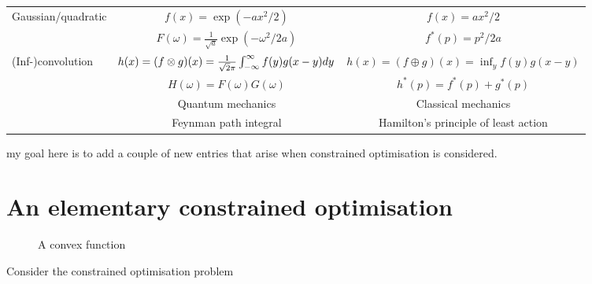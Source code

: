 \documentclass[10pt]{article}
\begin{document}
\begin{tabular}{| l | c | c |}
\hline

Gaussian/quadratic & $f(x) = \exp(-ax^2/2)$ & $f(x) = ax^2/2$ \\
& $F(\omega) = \frac{1}{\sqrt{a}}\exp(-\omega^2/2a)$ & $f^\ast(p) = p^2/2a$ \\

\hline

(Inf-)convolution & $h(x) = (f\otimes g)(x) = \frac{1}{\sqrt2\pi}\int_{-\infty}^{\infty} f(y)g(x-y)dy$ & $h(x) = (f\oplus g)(x) = \inf_y f(y)g(x-y)$ \\
& $H(\omega) = F(\omega)G(\omega)$ & $h^\ast(p) = f^\ast(p)+g^\ast(p)$ \\

\hline

& Quantum mechanics & Classical mechanics \\

\hline

& Feynman path integral & Hamilton's principle of least action \\

\hline

\end{tabular}

my goal here is to add a couple of new entries that arise when constrained optimisation is considered.

\section{An elementary constrained optimisation}
\label{sec:opt}

\begin{figure}
\centering
{}
\caption{A convex function}
\label{convex}
\end{figure}
Consider the constrained optimisation problem
\end{document}
